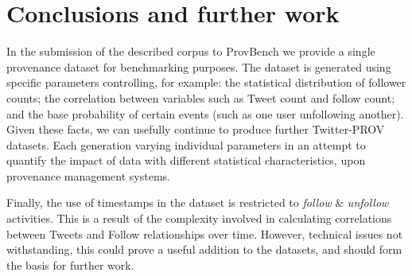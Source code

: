 \documentclass{llncs}
\begin{document}
\section{Conclusions and further work}
%
In the submission of the described corpus to ProvBench we provide a single provenance dataset for benchmarking purposes.
%
The dataset is generated using specific parameters controlling, for example:
%
the statistical distribution of follower counts;
%
the correlation between variables such as Tweet count and follow count;
%
and the base probability of certain events (such as one user unfollowing another).
%
Given these facts, we can usefully continue to produce further Twitter-PROV datasets.
%
Each generation varying individual parameters in an attempt to quantify the impact of data with different statistical characteristics, upon provenance management systems.
%

Finally, the use of timestamps in the dataset is restricted to \textit{follow} \& \textit{unfollow} activities. This is a result of the complexity involved in calculating correlations between Tweets and Follow relationships over time. However, technical issues not withstanding, this could prove a useful addition to the datasets, and should form the basis for further work.



\end{document}
